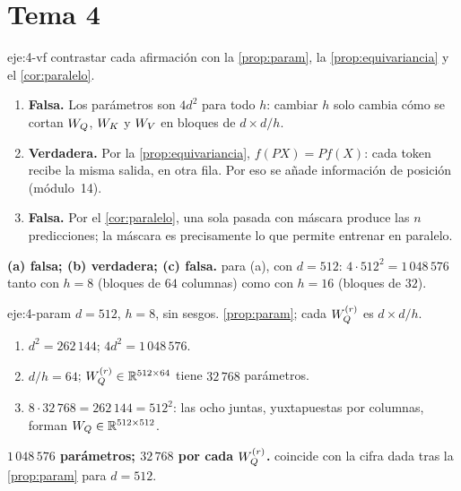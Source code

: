 \section{Tema 4}

\begin{solucion}{eje:4-vf}
\planteamiento contrastar cada afirmación con la \cref{prop:param}, la \cref{prop:equivariancia} y el \cref{cor:paralelo}.
\pasos
\begin{enumerate}[label=(\alph*)]
  \item \textbf{Falsa.} Los parámetros son $4d^{2}$ para todo $h$: cambiar $h$ solo cambia cómo se cortan $W_{Q}$, $W_{K}$ y $W_{V}$ en bloques de $d\times d/h$.
  \item \textbf{Verdadera.} Por la \cref{prop:equivariancia}, $f(PX)=Pf(X)$: cada token recibe la misma salida, en otra fila. Por eso se añade información de posición (módulo~14).
  \item \textbf{Falsa.} Por el \cref{cor:paralelo}, una sola pasada con máscara produce las $n$ predicciones; la máscara es precisamente lo que permite entrenar en paralelo.
\end{enumerate}
\resultado \textbf{(a) falsa; (b) verdadera; (c) falsa.}
\comprobacion para (a), con $d=512$: $4\cdot512^{2}=1\,048\,576$ tanto con $h=8$ (bloques de $64$ columnas) como con $h=16$ (bloques de $32$).
\end{solucion}

\begin{solucion}{eje:4-param}
\datos $d=512$, $h=8$, sin sesgos.
\planteamiento \cref{prop:param}; cada $W_{Q}^{(r)}$ es $d\times d/h$.
\pasos
\begin{enumerate}[label=\arabic*.]
  \item $d^{2}=262\,144$; $4d^{2}=1\,048\,576$.
  \item $d/h=64$; $W_{Q}^{(r)}\in\mathbb{R}^{512\times64}$ tiene $32\,768$ parámetros.
  \item $8\cdot32\,768=262\,144=512^{2}$: las ocho juntas, yuxtapuestas por columnas, forman $W_{Q}\in\mathbb{R}^{512\times512}$.
\end{enumerate}
\resultado \textbf{$1\,048\,576$ parámetros; $32\,768$ por cada $W_{Q}^{(r)}$.}
\comprobacion coincide con la cifra dada tras la \cref{prop:param} para $d=512$.
\end{solucion}

